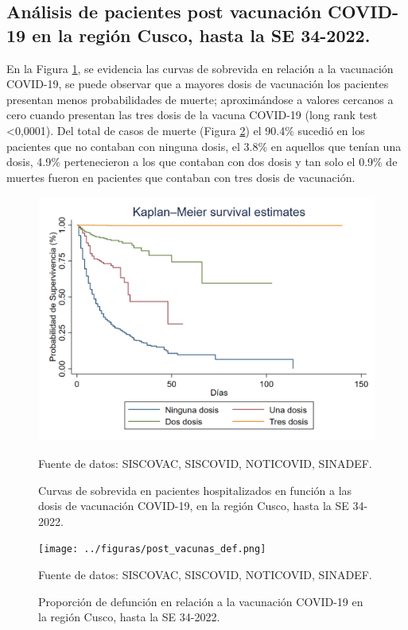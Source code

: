 \documentclass[12pt,a4paper,openany]{book}
\begin{document}
	\clearpage
\subsection*{Análisis de pacientes post vacunación COVID-19 en la región Cusco, hasta la SE 34-2022.}
\noindent En la Figura \ref{fig:supervivencia1}, se evidencia las curvas de sobrevida en relación a la vacunación COVID-19, se puede observar que a mayores dosis de vacunación los pacientes presentan menos probabilidades de muerte; aproximándose a valores cercanos a cero cuando presentan las tres dosis de la vacuna COVID-19 (long rank test <0,0001). Del total de casos de muerte (Figura \ref{fig:defunción_postvacunación}) el 90.4$\%$ sucedió en los pacientes que no contaban con ninguna dosis, el 3.8$\%$ en aquellos que tenían una dosis, 4.9$\%$ pertenecieron a los que contaban con dos dosis y tan solo el 0.9$\%$ de muertes fueron en pacientes que contaban con tres dosis de vacunación.

\begin{figure}[h]
	\caption{Curvas de sobrevida en pacientes hospitalizados en función a las dosis de vacunación COVID-19, en la región Cusco, hasta la SE 34-2022.}\label{fig:supervivencia1}
	\begin{center}
		\includegraphics[width=0.95\linewidth]{../figuras/supervivencia_1.png}
	\end{center}
	{\footnotesize {Fuente de datos: SISCOVAC, SISCOVID, NOTICOVID, SINADEF.}}
\end{figure}

\begin{figure}[h]
	\caption{Proporción de defunción en relación a la vacunación COVID-19 en la región Cusco, hasta la SE 34-2022.}\label{fig:defunción_postvacunación}
	\begin{center}
		\texttt{[image: ../figuras/post\_vacunas\_def.png]}
	\end{center}
	{\footnotesize {Fuente de datos: SISCOVAC, SISCOVID, NOTICOVID, SINADEF.}}
\end{figure}
\end{document}

